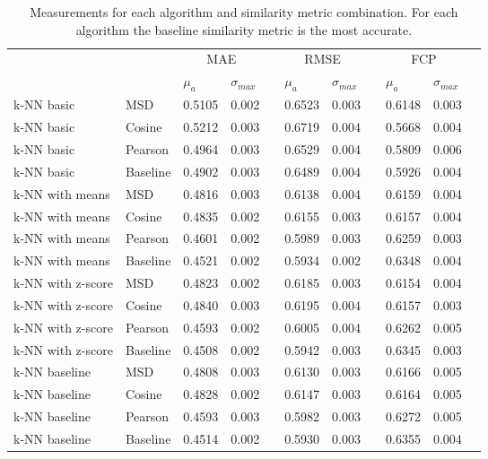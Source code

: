 \begin{sidewaystable}
    \centering
    \caption[Comparison of similarity metrics for \gls{knn} algorithms]{Measurements for each algorithm and similarity metric combination. For each algorithm the baseline similarity metric is the most accurate.}
    \small
    \begin{tabular}{ll ll l ll l ll  l}
                 && \multicolumn{2}{c}{MAE} &&
                 \multicolumn{2}{c}{RMSE} &&
                 \multicolumn{2}{c}{FCP} \\
    \cline{3-4} \cline{6-7} \cline{9-10}
    && $\mu_a$ & $\sigma_{max}$ && $\mu_a$ & $\sigma_{max}$ && $\mu_a$ & $\sigma_{max}$ \\
    \hline
k-NN basic        & MSD     & 0.5105 & 0.002 && 0.6523 & 0.003 && 0.6148 & 0.003 \\ %
k-NN basic        & Cosine  & 0.5212 & 0.003 && 0.6719 & 0.004 && 0.5668 & 0.004 \\ %
k-NN basic        & Pearson & 0.4964 & 0.003 && 0.6529 & 0.004 && 0.5809 & 0.006 \\ %
k-NN basic        & Baseline& \textcolor{scw-teal-darker}{0.4902} & 0.003 && 0.6489 & 0.004 && 0.5926 & 0.004 \\ %
k-NN with means   & MSD     & 0.4816 & 0.003 && 0.6138 & 0.004 && 0.6159 & 0.004 \\ %
k-NN with means   & Cosine  & 0.4835 & 0.002 && 0.6155 & 0.003 && 0.6157 & 0.004 \\ %
k-NN with means   & Pearson & 0.4601 & 0.002 && 0.5989 & 0.003 && 0.6259 & 0.003 \\ %
k-NN with means   & Baseline& \textcolor{scw-teal-darker}{0.4521} & 0.002 && 0.5934 & 0.002 && 0.6348 & 0.004 \\ %
k-NN with z-score & MSD     & 0.4823 & 0.002 && 0.6185 & 0.003 && 0.6154 & 0.004 \\ %
k-NN with z-score & Cosine  & 0.4840 & 0.003 && 0.6195 & 0.004 && 0.6157 & 0.003 \\ %
k-NN with z-score & Pearson & 0.4593 & 0.002 && 0.6005 & 0.004 && 0.6262 & 0.005 \\ %
k-NN with z-score & Baseline& \textcolor{scw-teal-darker}{0.4508} & 0.002 && 0.5942 & 0.003 && 0.6345 & 0.003 \\ %
k-NN baseline     & MSD     & 0.4808 & 0.003 && 0.6130 & 0.003 && 0.6166 & 0.005 \\ %
k-NN baseline     & Cosine  & 0.4828 & 0.002 && 0.6147 & 0.003 && 0.6164 & 0.005 \\ %
k-NN baseline     & Pearson & 0.4593 & 0.003 && 0.5982 & 0.003 && 0.6272 & 0.005 \\ %
k-NN baseline     & Baseline& \textcolor{scw-teal-darker}{0.4514} & 0.002 && 0.5930 & 0.003 && 0.6355 & 0.004 \\ %
    \end{tabular}
\end{sidewaystable}


